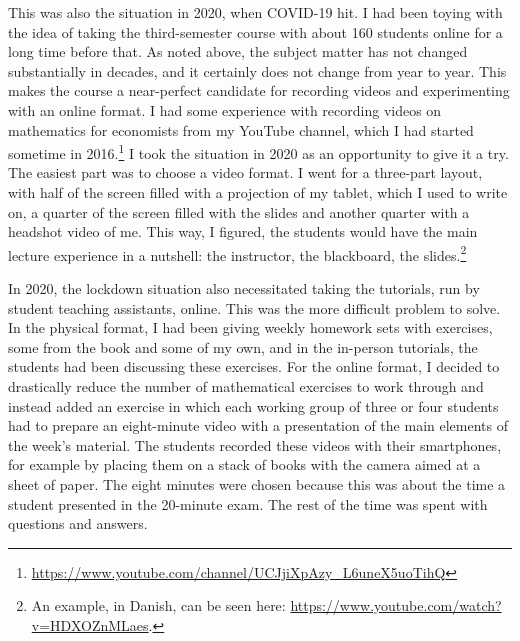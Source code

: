 \documentclass[10pt]{article}
\begin{document}
This was also the situation in 2020, when COVID-19 hit. I had been toying with the idea of taking the third-semester course with about 160 students online for a long time before that. As noted above, the subject matter has not changed substantially in decades, and it certainly does not change from year to year. This makes the course a near-perfect candidate for recording videos and experimenting with an online format. I had some experience with recording videos on mathematics for economists from my YouTube channel, which I had started sometime in 2016.\footnote{\url{https://www.youtube.com/channel/UCJjiXpAzy_L6uneX5uoTihQ}} I took the situation in 2020 as an opportunity to give it a try. The easiest part was to choose a video format. I went for a three-part layout, with half of the screen filled with a projection of my tablet, which I used to write on, a quarter of the screen filled with the slides and another quarter with a headshot video of me. This way, I figured, the students would have the main lecture experience in a nutshell: the instructor, the blackboard, the slides.\footnote{An example, in Danish, can be seen here: \url{https://www.youtube.com/watch?v=HDXOZnMLaes}.}

In 2020, the lockdown situation also necessitated taking the tutorials, run by student teaching assistants, online. This was the more difficult problem to solve. In the physical format, I had been giving weekly homework sets with exercises, some from the book and some of my own, and in the in-person tutorials, the students had been discussing these exercises. For the online format, I decided to drastically reduce the number of mathematical exercises to work through and instead added an exercise in which each working group of three or four students had to prepare an eight-minute video with a presentation of the main elements of the week's material. The students recorded these videos with their smartphones, for example by placing them on a stack of books with the camera aimed at a sheet of paper. The eight minutes were chosen because this was about the time a student presented in the 20-minute exam. The rest of the time was spent with questions and answers. 
\end{document}
